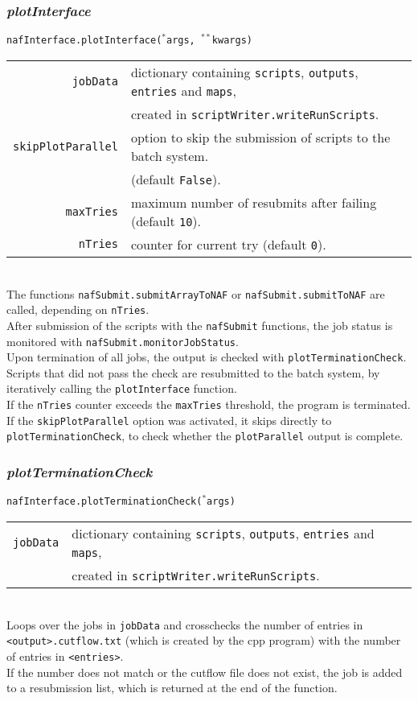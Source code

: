 \documentclass[12pt, a4paper]{article}
\newcommand{\args}{$^*$args}
\newcommand{\kwargs}{$^{**}$kwargs}
\begin{document}
\subsubsection{\textit{plotInterface}}
\label{plotSubmit}
\texttt{nafInterface.plotInterface(\args, \kwargs)}\\
\begin{tabular}{r|l}
\hline
\texttt{jobData}			&	dictionary containing \texttt{scripts}, \texttt{outputs}, \texttt{entries} and \texttt{maps},\\
							&	created in \texttt{scriptWriter.writeRunScripts}.\\
\texttt{skipPlotParallel}	&	option to skip the submission of scripts to the batch system.\\
							&	(default \texttt{False}).\\
\texttt{maxTries}			&	maximum number of resubmits after failing (default \texttt{10}).\\
\texttt{nTries}				&	counter for current try (default \texttt{0}).\\
\hline
\end{tabular}
\\
The functions \texttt{nafSubmit.submitArrayToNAF} or \texttt{nafSubmit.submitToNAF} are called, depending on \texttt{nTries}.\\
After submission of the scripts with the \texttt{nafSubmit} functions, the job status is monitored with \texttt{nafSubmit.monitorJobStatus}. \\
Upon termination of all jobs, the output is checked with \texttt{plotTerminationCheck}. Scripts that did not pass the check are resubmitted to the batch system, by iteratively calling the \texttt{plotInterface} function.\\
If the \texttt{nTries} counter exceeds the \texttt{maxTries} threshold, the program is terminated.\\
If the \texttt{skipPlotParallel} option was activated, it skips directly to \texttt{plotTerminationCheck}, to check whether the \texttt{plotParallel} output is complete.\\


\subsubsection{\textit{plotTerminationCheck}}
\texttt{nafInterface.plotTerminationCheck(\args)}\\
\begin{tabular}{r|l}
\hline
\texttt{jobData}		&	dictionary containing \texttt{scripts}, \texttt{outputs}, \texttt{entries} and \texttt{maps},\\
						&	created in \texttt{scriptWriter.writeRunScripts}.\\
\hline
\end{tabular}
\\
Loops over the jobs in \texttt{jobData} and crosschecks the number of entries in \texttt{<output>.cutflow.txt} (which is created by the cpp program) with the number of entries in \texttt{<entries>}.\\
If the number does not match or the cutflow file does not exist, the job is added to a resubmission list, which is returned at the end of the function. 
\end{document}
